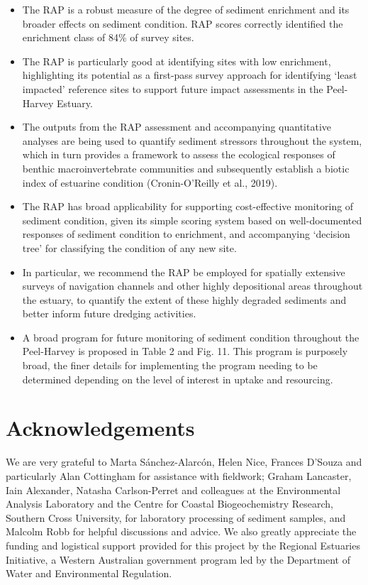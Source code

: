 \documentclass[
]{book}
\begin{document}
\begin{itemize}
\item
  The RAP is a robust measure of the degree of sediment enrichment and its broader effects on sediment condition. RAP scores correctly identified the enrichment class of 84\% of survey sites.
\item
  The RAP is particularly good at identifying sites with low enrichment, highlighting its potential as a first-pass survey approach for identifying `least impacted' reference sites to support future impact assessments in the Peel-Harvey Estuary.
\item
  The outputs from the RAP assessment and accompanying quantitative analyses are being used to quantify sediment stressors throughout the system, which in turn provides a framework to assess the ecological responses of benthic macroinvertebrate communities and subsequently establish a biotic index of estuarine condition (Cronin-O'Reilly et al., 2019).
\item
  The RAP has broad applicability for supporting cost-effective monitoring of sediment condition, given its simple scoring system based on well-documented responses of sediment condition to enrichment, and accompanying `decision tree' for classifying the condition of any new site.
\item
  In particular, we recommend the RAP be employed for spatially extensive surveys of navigation channels and other highly depositional areas throughout the estuary, to quantify the extent of these highly degraded sediments and better inform future dredging activities.
\item
  A broad program for future monitoring of sediment condition throughout the Peel-Harvey is proposed in Table 2 and Fig. 11. This program is purposely broad, the finer details for implementing the program needing to be determined depending on the level of interest in uptake and resourcing.
\end{itemize}

\hypertarget{acknowledgements-3}{%
\section{Acknowledgements}\label{acknowledgements-3}}

We are very grateful to Marta Sánchez-Alarcón, Helen Nice, Frances D'Souza and particularly Alan Cottingham for assistance with fieldwork; Graham Lancaster, Iain Alexander, Natasha Carlson-Perret and colleagues at the Environmental Analysis Laboratory and the Centre for Coastal Biogeochemistry Research, Southern Cross University, for laboratory processing of sediment samples, and Malcolm Robb for helpful discussions and advice. We also greatly appreciate the funding and logistical support provided for this project by the Regional Estuaries Initiative, a Western Australian government program led by the Department of Water and Environmental Regulation.
\end{document}
